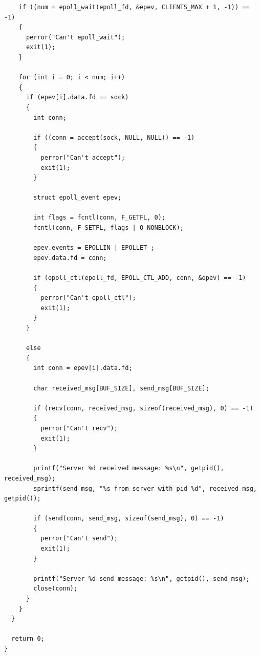 \begin{lstlisting}
    if ((num = epoll_wait(epoll_fd, &epev, CLIENTS_MAX + 1, -1)) == -1)
    {
      perror("Can't epoll_wait");
      exit(1);
    }

    for (int i = 0; i < num; i++)
    {
      if (epev[i].data.fd == sock)
      {
        int conn;

        if ((conn = accept(sock, NULL, NULL)) == -1)
        {
          perror("Can't accept");
          exit(1);
        }

        struct epoll_event epev;

        int flags = fcntl(conn, F_GETFL, 0);
        fcntl(conn, F_SETFL, flags | O_NONBLOCK);

        epev.events = EPOLLIN | EPOLLET ;
        epev.data.fd = conn;

        if (epoll_ctl(epoll_fd, EPOLL_CTL_ADD, conn, &epev) == -1)
        {
          perror("Can't epoll_ctl");
          exit(1);
        }
      }

      else
      {
        int conn = epev[i].data.fd;

        char received_msg[BUF_SIZE], send_msg[BUF_SIZE];

        if (recv(conn, received_msg, sizeof(received_msg), 0) == -1)
        {
          perror("Can't recv");
          exit(1);
        }

        printf("Server %d received message: %s\n", getpid(), received_msg);
        sprintf(send_msg, "%s from server with pid %d", received_msg, getpid());

        if (send(conn, send_msg, sizeof(send_msg), 0) == -1)
        {
          perror("Can't send");
          exit(1);
        }

        printf("Server %d send message: %s\n", getpid(), send_msg);
        close(conn);
      }
    }
  }

  return 0;
}
\end{lstlisting}